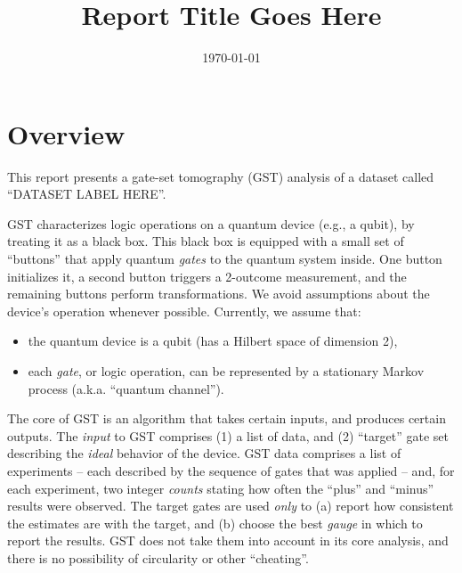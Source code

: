 \documentclass{article}[11pt]
\newcommand{\putfield}[2]{#2}
\begin{document}
\title{\putfield{title}{Report Title Goes Here}}
\date{\vspace{-1cm}\today}

\begingroup
\let\center\flushleft
\let\endcenter\endflushleft
\maketitle
\endgroup

\section{Overview}
This report presents a gate-set tomography (GST) analysis of a dataset called ``\putfield{datasetLabel}{DATASET LABEL HERE}''.  

GST characterizes logic operations on a quantum device (e.g., a qubit), by treating it as a black box.  This black box is equipped with a small set of ``buttons'' that apply quantum \emph{gates} to the quantum system inside.  One button initializes it, a second button triggers a 2-outcome measurement, and the remaining buttons perform transformations.  We avoid assumptions about the device's operation whenever possible.  Currently, we assume that:
\begin{itemize}
\item the quantum device is a qubit (has a Hilbert space of dimension 2),
\item each \emph{gate}, or logic operation, can be represented by a stationary Markov process (a.k.a. ``quantum channel'').
\end{itemize}
The core of GST is an algorithm that takes certain inputs, and produces certain outputs.  The \emph{input} to GST comprises (1) a list of data, and (2) ``target'' gate set describing the \emph{ideal} behavior of the device.  GST data comprises a list of experiments -- each described by the sequence of gates that was applied -- and, for each experiment, two integer \emph{counts} stating how often the ``plus'' and ``minus'' results were observed.  The target gates are used \emph{only} to (a) report how consistent the estimates are with the target, and (b) choose the best \emph{gauge} in which to report the results.  GST does not take them into account in its core analysis, and there is no possibility of circularity or other ``cheating''.
\end{document}
